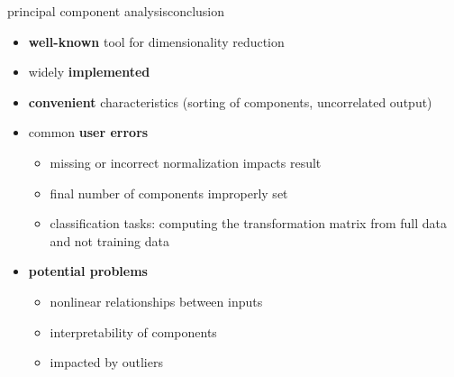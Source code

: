 \begin{frame}{principal component analysis}{conclusion}
    \begin{itemize}
			\item	\textbf{well-known} tool for dimensionality reduction
			\item widely \textbf{implemented}
			\item \textbf{convenient} characteristics (sorting of components, uncorrelated output)
			\smallskip
			\item<2-> common \textbf{user errors}
				\begin{itemize}
					\item missing or incorrect normalization impacts result
					\item final number of components improperly set
					\item classification tasks: computing the transformation matrix from full data and not training data
				\end{itemize}
			\smallskip
			\item<3-> \textbf{potential problems}
			\begin{itemize}
					\item nonlinear relationships between inputs
					\item interpretability of components
					\item impacted by outliers
			\end{itemize}
		\end{itemize}	
\end{frame}
